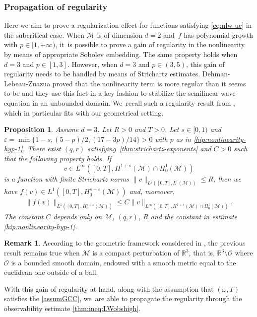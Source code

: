 \documentclass[JEP,XML,SOM,Unicode,published]{cedram}
\newtheorem{proposition}[theorem]{Proposition}
\theoremstyle{definition}
\newtheorem{remark}[theorem]{Remark}
\let\mc\mathcal
\let\veps\varepsilon
\newcommand{\M}{\mc{M}}
\renewcommand{\O}{\mc{O}}
\newcommand{\R}{\mathbb{R}}
\providecommand{\norm}[1]{\lVert#1\rVert}
\begin{document}
\subsubsection{Propagation of regularity} Here we aim to prove a regularization effect for functions satisfying \eqref{eq:nlw-uc} in the subcritical case. When $\M$ is of dimension $d=2$ and~$f$ has polynomial growth with $p\in [1, +\infty)$, it~is possible to prove a gain of regularity in the nonlinearity by means of appropriate Sobolev embedding. The same property holds when $d=3$ and $p\in [1, 3]$. However, when $d=3$ and $p\in (3, 5)$, this gain of regularity needs to be handled by means of Strichartz estimates. Dehman-Lebeau-Zuazua \cite[Th.\,8]{DLZ03} proved that the nonlinearity term is more regular than it seems to be and they use this fact in a key fashion to stabilize the semilinear wave equation in an unbounded domain. We~recall such a regularity result from \cite[Cor.\,4.2]{JL13}, which in particular fits with our geometrical setting.

\begin{proposition}\label{prop:gain-reg-nonlinearity}
Assume $d=3$. Let $R>0$ and $T>0$. Let $s\in [0, 1)$ and $\veps=\min\{1-s, (5-p)/2, (17-3p)/14\}>0$ with $p$ as in \eqref{hip:nonlinearity-hyp-1}. There exist $(q, r)$ satisfying~\eqref{thm:strichartz-exponents} and $C>0$ such that the following property holds. If
\[
v\in L^\infty([0, T], H^{1+s}(\M)\cap H_0^1(\M))
\]
is a function with finite Strichartz norms $\norm{v}_{L^q([0, T], L^r(\M))}\leq R$, then we have $f(v)\in L^1([0, T], H_0^{s+\veps}(\M))$ and, moreover,
\begin{align*}
\norm{f(v)}_{L^1([0, T], H_0^{s+\veps}(\M))}\leq C\norm{v}_{L^\infty([0, T], H^{1+s}(\M)\cap H_0^1(\M))}.
\end{align*}
The constant $C$ depends only on $\M$, $(q, r)$, $R$ and the constant in estimate \eqref{hip:nonlinearity-hyp-1}.
\end{proposition}
\begin{remark}\label{rk:gain-reg-cpct-pert}
According to the geometric framework considered in \cite{JL13}, the previous result remains true when $\M$ is a compact perturbation of $\R^3$, that is, $\R^3\setminus\O$ where $\O$ is a bounded smooth domain, endowed with a smooth metric equal to the euclidean one outside of a ball.
\end{remark}

With this gain of regularity at hand, along with the assumption that $(\omega, T)$ satisfies the \ref{assumGCC}, we~are able to propagate the regularity through the observability estimate \eqref{thm:ineq:LWobshigh}.
\end{document}
